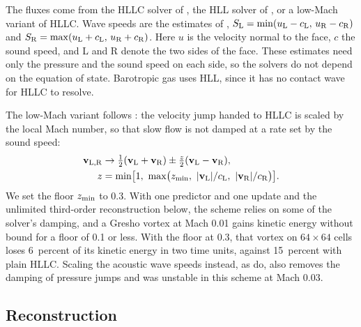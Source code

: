 \documentclass[twocolumn]{aastex701}
\begin{document}
The fluxes come from the HLLC solver of \citet{Toro1994}, the HLL solver of \citet{Harten1983}, or a low-Mach variant of HLLC. Wave speeds are the estimates of \citet{Davis1988}, { $S_{\rm L} = \min(u_{\rm L} - c_{\rm L},\, u_{\rm R} - c_{\rm R})$} and { $S_{\rm R} = \max(u_{\rm L} + c_{\rm L},\, u_{\rm R} + c_{\rm R})$}. Here $u$ is the velocity normal to the face, $c$ the sound speed, and L and R denote the two sides of the face. These estimates need only the pressure and the sound speed on each side, so the solvers do not depend on the equation of state. Barotropic gas uses HLL, since it has no contact wave for HLLC to resolve.

The low-Mach variant follows \citet{Thornber2008}: the velocity jump handed to HLLC is scaled by the local Mach number, so that slow flow is not damped at a rate set by the sound speed:
\begin{equation*}
\begin{aligned}
\mathbf{v}_{\rm L,R} &\rightarrow \tfrac{1}{2}(\mathbf{v}_{\rm L} + \mathbf{v}_{\rm R}) \pm \tfrac{z}{2}(\mathbf{v}_{\rm L} - \mathbf{v}_{\rm R}),\\
z &= \min\bigl[1,\ \max\bigl(z_{\rm min},\ |\mathbf{v}_{\rm L}|/c_{\rm L},\ |\mathbf{v}_{\rm R}|/c_{\rm R}\bigr)\bigr].
\end{aligned}
\end{equation*}
We set the floor $z_{\rm min}$ to 0.3. With one predictor and one update and the unlimited third-order reconstruction below, the scheme relies on some of the solver's damping, and a Gresho vortex \citep{Gresho1990} at Mach 0.01 gains kinetic energy without bound for a floor of 0.1 or less. With the floor at 0.3, that vortex on $64 \times 64$ cells loses 6~percent of its kinetic energy in two time units, against 15~percent with plain HLLC. Scaling the acoustic wave speeds instead, as \citet{Fleischmann2020} do, also removes the damping of pressure jumps and was unstable in this scheme at Mach 0.03.

\subsection{Reconstruction}
\label{sec:recon}
\end{document}
